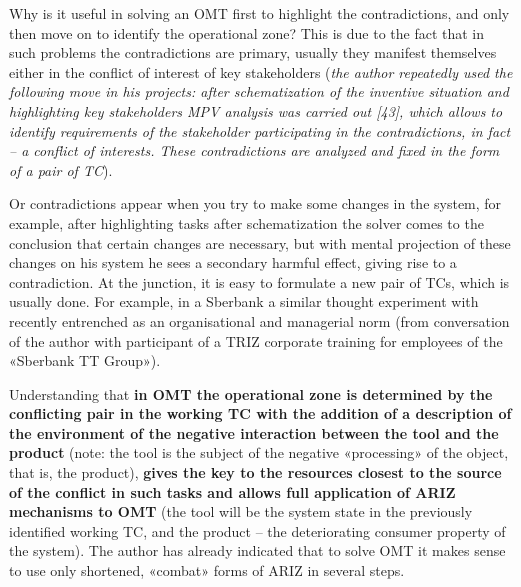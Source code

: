 \documentclass[11pt,a4paper]{book}
\begin{document}
Why is it useful in solving an OMT first to highlight the contradictions, and
only then move on to identify the operational zone?  This is due to the fact
that in such problems the contradictions are primary, usually they manifest
themselves either in the conflict of interest of key stakeholders (\emph{the
  author repeatedly used the following move in his projects: after
  schematization of the inventive situation and highlighting key stakeholders
  MPV analysis was carried out [43], which allows to identify requirements of
  the stakeholder participating in the contradictions, in fact -- a conflict
  of interests.  These contradictions are analyzed and fixed in the form of a
  pair of TC}).

Or contradictions appear when you try to make some changes in the system, for
example, after highlighting tasks after schematization the solver comes to the
conclusion that certain changes are necessary, but with mental projection of
these changes on his system he sees a secondary harmful effect, giving rise to
a contradiction. At the junction, it is easy to formulate a new pair of TCs,
which is usually done. For example, in a Sberbank a similar thought experiment
with recently entrenched as an organisational and managerial norm (from
conversation of the author with participant of a TRIZ corporate training for
employees of the «Sberbank TT Group»).

Understanding that \textbf{in OMT the operational zone is determined by the
  conflicting pair in the working TC with the addition of a description of the
  environment of the negative interaction between the tool and the product}
(note: the tool is the subject of the negative «processing» of the object,
that is, the product), \textbf{gives the key to the resources closest to the
  source of the conflict in such tasks and allows full application of ARIZ
  mechanisms to OMT} (the tool will be the system state in the previously
identified working TC, and the product -- the deteriorating consumer property
of the system). The author has already indicated that to solve OMT it makes
sense to use only shortened, «combat» forms of ARIZ in several steps.

\end{document}
